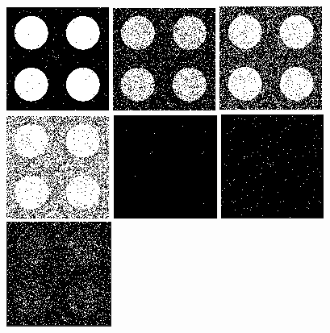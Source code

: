 \documentclass[a4paper,12pt]{report}
\begin{document}
\begin{figure}[!ht]
	\includegraphics[scale=0.3]{image/text11.png}
	\includegraphics[scale=0.3]{image/text21.png}
	\includegraphics[scale=0.3]{image/text31.png}
	\includegraphics[scale=0.3]{image/text41.png}
	\center
	\includegraphics[scale=0.3]{image/diff0.png}
	\includegraphics[scale=0.3]{image/diff1.png}
	\includegraphics[scale=0.3]{image/diff2.png}

\end{figure}
\end{document}
